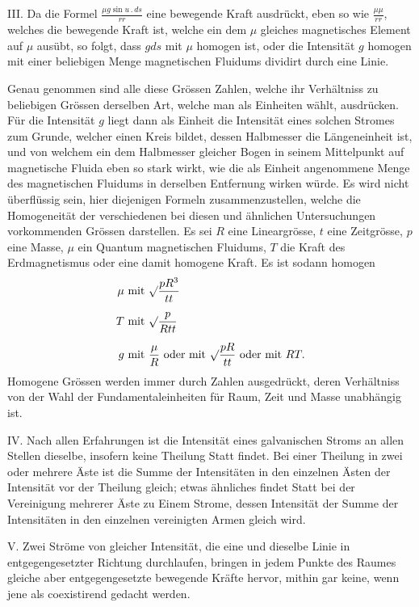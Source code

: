 III. Da die Formel $\frac{\mu g\sin u\mathbin{.}ds}{rr}$ eine bewegende Kraft ausdrückt, eben so wie $\frac{\mu\mu}{rr}$, welches die bewegende Kraft ist, welche ein dem $\mu$ gleiches magnetisches Element auf $\mu$ ausübt, so folgt, dass $gds$ mit $\mu$ homogen ist, oder die Intensität $g$ homogen mit einer beliebigen Menge magnetischen Fluidums dividirt durch eine Linie.

Genau genommen sind alle diese Grössen Zahlen, welche ihr Verhältniss zu beliebigen Grössen derselben Art, welche man als Einheiten wählt, ausdrücken. Für die Intensität $g$ liegt dann als Einheit die Intensität eines solchen Stromes zum Grunde, welcher einen Kreis bildet, dessen Halbmesser die Längeneinheit ist, und von welchem ein dem Halbmesser gleicher Bogen in seinem Mittelpunkt auf magnetische Fluida eben so stark wirkt, wie die als Einheit angenommene Menge des magnetischen Fluidums in derselben Entfernung wirken würde. Es wird nicht überflüssig sein, hier diejenigen Formeln zusammenzustellen, welche die Homogeneität der verschiedenen bei diesen und ähnlichen Untersuchungen vorkommenden Grössen darstellen. Es sei $R$ eine Lineargrösse, $t$ eine Zeitgrösse, $p$ eine Masse, $\mu$ ein Quantum magnetischen Fluidums, $T$ die Kraft des Erdmagnetismus oder eine damit homogene Kraft. Es ist sodann homogen
\[
\begin{aligned}
\mu&\text{ mit }\surd\frac{pR^3}{tt}\\[5pt]
T&\text{ mit }\surd\frac{p}{Rtt}\\[5pt]
g&\text{ mit }\frac{\mu}{R}\text{ oder mit }\surd\frac{pR}{tt}\text{ oder mit }RT.
\end{aligned}
\]
\noindent Homogene Grössen werden immer durch Zahlen ausgedrückt, deren Verhältniss von der Wahl der Fundamentaleinheiten für Raum, Zeit und Masse unabhängig ist.

IV. Nach allen Erfahrungen ist die Intensität eines galvanischen Stroms
\clearpage{}
\noindent an allen Stellen dieselbe, insofern keine Theilung Statt findet. Bei einer Theilung in zwei oder mehrere Äste ist die Summe der Intensitäten in den einzelnen Ästen der Intensität vor der Theilung gleich; etwas ähnliches findet Statt bei der Vereinigung mehrerer Äste zu Einem Strome, dessen Intensität der Summe der Intensitäten in den einzelnen vereinigten Armen gleich wird.

V. Zwei Ströme von gleicher Intensität, die eine und dieselbe Linie in entgegengesetzter Richtung durchlaufen, bringen in jedem Punkte des Raumes gleiche aber entgegengesetzte bewegende Kräfte hervor, mithin gar keine, wenn jene als coexistirend gedacht werden.

